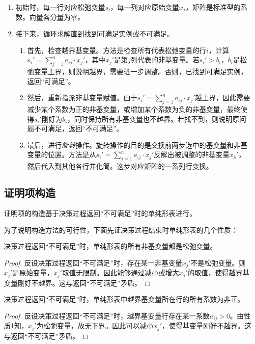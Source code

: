 \begin{enumerate}
  \item 初始时，每一行对应松弛变量$s_i$，每一列对应原始变量$x_j$，矩阵是标准型的系数。向量各分量为零。
  \item 接下来，循环求解直到找到可满足实例或不可满足。
    \begin{enumerate}
      \item 首先，检查越界基变量。方法是检查所有代表松弛变量的行$i$，计算$s_i' = \sum_{j=1}^{n} a_{ij} \cdot x_j'$，其中$x_j'$是第$j$列代表的非基变量。若$s_i' > b_i$，$b_i$是松弛变量上界，则说明越界，需要进一步调整。否则，已找到可满足实例，返回``可满足''。
      \item 然后，重新指派非基变量赋值。由于$s_i' = \sum_{j=1}^{n} a_{ij} \cdot x_j'$越上界，因此需要减少某个系数为正的非基变量，或增加某个系数为负的非基变量，最终使得$s_i'$刚好为$b_i$，同时保持所有非基变量也不越界。若找不到，则说明原问题不可满足，返回``不可满足''。
      \item 最后，进行\emph{旋转}操作。旋转操作的目的是交换前两步选中的基变量和非基变量的位置。方法是从$s_i' = \sum_{j=1}^{n} a_{ij} \cdot x_j'$反解出被调整的非基变量$x_k'$，然后代入到其他各行并化简。这步对应矩阵的一系列行变换。
    \end{enumerate}
\end{enumerate}

\subsection{证明项构造}
证明项的构造基于决策过程返回``不可满足''时的单纯形表进行。

为了说明构造方法的可行性，下面先证决策过程结束时单纯形表的几个性质：
\begin{theorem}[性质1]
  决策过程返回``不可满足''时，单纯形表的所有非基变量都是松弛变量。
\end{theorem}
\begin{proof}
反设决策过程返回``不可满足''时，存在某一非基变量$x_j'$不是松弛变量。则$x_j'$是原始变量，$x_j'$取值无限制。因此能够通过减小或增大$x_j'$的取值，使得越界基变量刚好不越界。这与返回``不可满足''矛盾。
\end{proof}

\begin{theorem}[性质2]
  决策过程返回``不可满足''时，单纯形表中越界基变量所在行的所有系数为非正。
\end{theorem}
\begin{proof}
反设决策过程返回``不可满足''时，越界基变量行存在某一系数$a_{ij} > 0$。由性质1知，$x_j'$为松弛变量，故无下界。因此可以减小$x_j'$，使得基变量刚好不越界。这与返回``不可满足''矛盾。
\end{proof}

